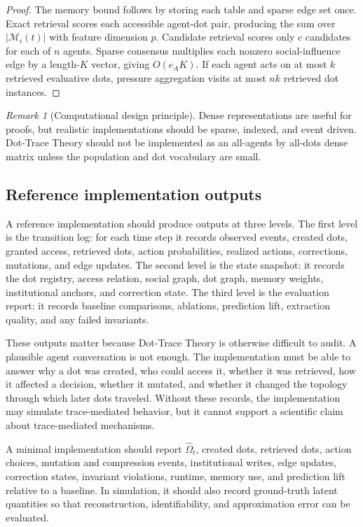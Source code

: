 \documentclass[11pt]{article}
\theoremstyle{remark}
\newtheorem{remark}{Remark}
\begin{document}
\begin{proof}
The memory bound follows by storing each table and sparse edge set once.
Exact retrieval scores each accessible agent-dot pair, producing the sum
over $|\mathcal M_i(t)|$ with feature dimension $p$. Candidate retrieval scores
only $c$ candidates for each of $n$ agents. Sparse consensus multiplies
each nonzero social-influence edge by a length-$K$ vector, giving
$O(e_AK)$. If each agent acts on at most $k$ retrieved evaluative dots,
pressure aggregation visits at most $nk$ retrieved dot instances.
\end{proof}

\begin{remark}[Computational design principle]
Dense representations are useful for proofs, but realistic
implementations should be sparse, indexed, and event driven. Dot-Trace
Theory should not be implemented as an all-agents by all-dots dense
matrix unless the population and dot vocabulary are small.
\end{remark}

\subsection{Reference implementation outputs}\label{reference-implementation-outputs}

A reference implementation should produce outputs at three levels. The first level is the transition log: for each time step it records observed events, created dots, granted access, retrieved dots, action probabilities, realized actions, corrections, mutations, and edge updates. The second level is the state snapshot: it records the dot registry, access relation, social graph, dot graph, memory weights, institutional anchors, and correction state. The third level is the evaluation report: it records baseline comparisons, ablations, prediction lift, extraction quality, and any failed invariants.

These outputs matter because Dot-Trace Theory is otherwise difficult to audit. A plausible agent conversation is not enough. The implementation must be able to answer why a dot was created, who could access it, whether it was retrieved, how it affected a decision, whether it mutated, and whether it changed the topology through which later dots traveled. Without these records, the implementation may simulate trace-mediated behavior, but it cannot support a scientific claim about trace-mediated mechanisms.


A minimal implementation should report $\widehat\Omega_t$, created dots,
retrieved dots, action choices, mutation and compression events,
institutional writes, edge updates, correction states, invariant
violations, runtime, memory use, and prediction lift relative to a
baseline. In simulation, it should also record ground-truth latent
quantities so that reconstruction, identifiability, and approximation
error can be evaluated.
\end{document}
